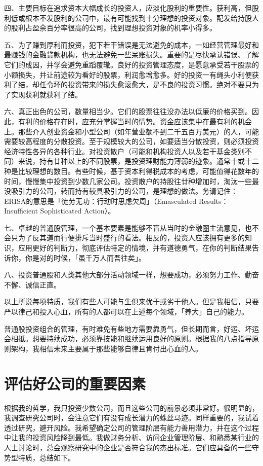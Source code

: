 \documentclass[UTF8,a4paper,zihao=-4,fontset = windows]{ctexart} %
\begin{document}
四、主要目标在追求资本大幅成长的投资人，应淡化股利的重要性。获利高，但股利低或根本不发股利的公司中，最有可能找到十分理想的投资对象。配发给持股人的股利占盈余百分率很高的公司，找到理想投资对象的机率小得多。

五、为了赚到厚利而投资，犯下若干错误是无法避免的成本，一如经营管理最好和最赚钱的金融贷款机构，也无法避免一些呆账损失。重要的是尽快承认错误、了解它们的成因，并学会避免重蹈覆辙。良好的投资管理态度，是愿意承受若干股票的小额损失，并让前途较为看好的股票，利润愈增愈多。好的投资一有绳头小利便获利了结，却任令坏的投资带来的损失愈滚愈大，是不良的投资习惯。绝对不要只为了实现获利就获利了结。

六、真正出色的公司，数量相当少。它们的股票往往没办法以低廉的价格买到。因此，有利的价格存在时，应充分掌握当时的情势。资金应该集中在最有利的机会上。那些介入创业资金和小型公司（如年营业额不到二千五百万美元）的人，可能需要较高程度的分散投资。至于规模较大的公司，如要适当分散投资，则必须投资经济特性各异的各种行业。对投资散户（可能和机构投资人以及若干基金类别不同）来说，持有廿种以上的不同股票，是投资理财能力薄弱的迹象。通常十或十二种是比较理想的数目。有些时候，基于资本利得税成本的考虑，可能值得花数年的时间，慢慢集中投资到少数几家公司。投资散户的持股往廿种增加时，淘汰一些最没吸引力的公司，转而持有较具吸引力的公司，是理想的做法。务请记住：ERISA的意思是「徒劳无功：行动时思虑欠周」（Emasculated Results：Insufficient Sophisticated Action）。

七、卓越的普通股管理，一个基本要素是能够不盲从当时的金融圈主流意见，也不会只为了反其道而行便排斥当时盛行的看法。相反的，投资人应该拥有更多的知识，应用更好的判断力，彻底评估特定的情境，并有道德勇气，在你的判断结果告诉你，你是对的时候，「虽千万人而吾往矣」。

八、投资普通股和人类其他大部分活动领域一样，想要成功，必须努力工作、勤奋不懈、诚信正直。


以上所说每项特质，我们有些人可能与生俱来优于或劣于他人。但是我相信，只要严以律己和投入心血，所有的人都可以在上述每个领域，「养大」自己的能力。

普通股投资组合的管理，有时难免有些地方需要靠勇气，但长期而言，好运、坏运会相抵。想要持续成功，必须靠技能和继续运用良好的原则。根据我的八点指导原则架构，我相信未来主要属于那些能够自律且肯付出心血的人。

\appendix
\section{评估好公司的重要因素}

根据我的哲学，我只投资少数公司，而且这些公司的前景必须非常好。很明显的，我调查研究公司时，会注意它们有没有成长潜力的蛛丝马迹。同样重要的，我试着透过研究，避开风险。我希望确定公司的管理阶层有能力善用潜力，并在这个过程中让我的投资风险降到最低。我做财务分析、访问企业管理阶层、和熟悉某行业的人士讨论时，总会观察研究中的企业是否符合我的杰出标准。它们应具备的一些守势型特质，总结如下。
\\
\end{document}
